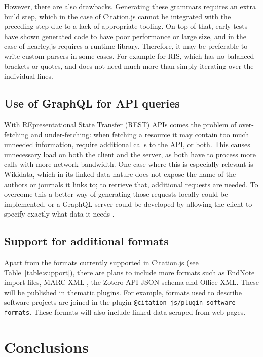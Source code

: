 \documentclass[fleqn,10pt,lineno]{wlpeerj} %
\begin{document}
However, there are also drawbacks. Generating these grammars requires an extra build step, which in the case of Citation.js cannot be integrated with the preceding step due to a lack of appropriate tooling. On top of that, early tests have shown generated code to have poor performance or large size, and in the case of nearley.js requires a runtime library. Therefore, it may be preferable to write custom parsers in some cases. For example for RIS, which has no balanced brackets or quotes, and does not need much more than simply iterating over the individual lines.

\subsection*{Use of GraphQL for API queries}

With REpresentational State Transfer (REST) APIs comes the problem of over-fetching and under-fetching: when fetching a resource it may contain too much unneeded information, require additional calls to the API, or both. This causes unnecessary load on both the client and the server, as both have to process more calls with more network bandwidth. One case where this is especially relevant is Wikidata, which in its linked-data nature does not expose the name of the authors or journals it links to; to retrieve that, additional requests are needed. To overcome this a better way of generating those requests locally could be implemented, or a GraphQL server could be developed by allowing the client to specify exactly what data it needs \citep{noauthor_graphql_2018}.

\subsection*{Support for additional formats}

Apart from the formats currently supported in Citation.js (see Table~\ref{table:support}), there are plans to include more formats such as EndNote import files, MARC XML \citep{avram_machine-readable_nodate}, the Zotero API JSON schema and Office XML. These will be published in thematic plugins. For example, formats used to describe software projects are joined in the plugin \texttt{@citation-js/plugin-software-formats}. These formats will also include linked data scraped from web pages.

\section*{Conclusions}
\end{document}

